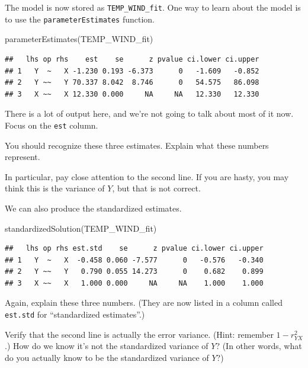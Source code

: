 \documentclass[
]{book}
\newenvironment{Shaded}{\begin{snugshade}}{\end{snugshade}}
\newcommand{\FunctionTok}[1]{\textcolor[rgb]{0.00,0.00,0.00}{#1}}
\newcommand{\NormalTok}[1]{#1}
\begin{document}
The model is now stored as \texttt{TEMP\_WIND\_fit}. One way to learn about the model is to use the \texttt{parameterEstimates} function.

\begin{Shaded}
\begin{Highlighting}[]
\FunctionTok{parameterEstimates}\NormalTok{(TEMP\_WIND\_fit)}
\end{Highlighting}
\end{Shaded}

\begin{verbatim}
##   lhs op rhs    est    se      z pvalue ci.lower ci.upper
## 1   Y  ~   X -1.230 0.193 -6.373      0   -1.609   -0.852
## 2   Y ~~   Y 70.337 8.042  8.746      0   54.575   86.098
## 3   X ~~   X 12.330 0.000     NA     NA   12.330   12.330
\end{verbatim}

There is a lot of output here, and we're not going to talk about most of it now. Focus on the \texttt{est} column.

You should recognize these three estimates. Explain what these numbers represent.

In particular, pay close attention to the second line. If you are hasty, you may think this is the variance of \(Y\), but that is not correct.

We can also produce the standardized estimates.

\begin{Shaded}
\begin{Highlighting}[]
\FunctionTok{standardizedSolution}\NormalTok{(TEMP\_WIND\_fit)}
\end{Highlighting}
\end{Shaded}

\begin{verbatim}
##   lhs op rhs est.std    se      z pvalue ci.lower ci.upper
## 1   Y  ~   X  -0.458 0.060 -7.577      0   -0.576   -0.340
## 2   Y ~~   Y   0.790 0.055 14.273      0    0.682    0.899
## 3   X ~~   X   1.000 0.000     NA     NA    1.000    1.000
\end{verbatim}

Again, explain these three numbers. (They are now listed in a column called \texttt{est.std} for ``standardized estimates''.)

Verify that the second line is actually the error variance. (Hint: remember \(1 - r_{YX}^{2}\).) How do we know it's not the standardized variance of \(Y\)? (In other words, what do you actually know to be the standardized variance of \(Y\)?)
\end{document}
